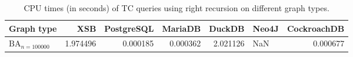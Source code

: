\begin{table}
\caption{CPU times (in seconds) of TC queries using right recursion on different graph types.}
\label{table:right_recursion_cpu_time}
\begin{tabular}{lrrrrlr}
\toprule
Graph type & XSB & PostgreSQL & MariaDB & DuckDB & Neo4J & CockroachDB \\
\midrule
$\text{BA}_{n=100000}$ & 1.974496 & 0.000185 & 0.000362 & 2.021126 & NaN & 0.000677 \\
\bottomrule
\end{tabular}
\end{table}
